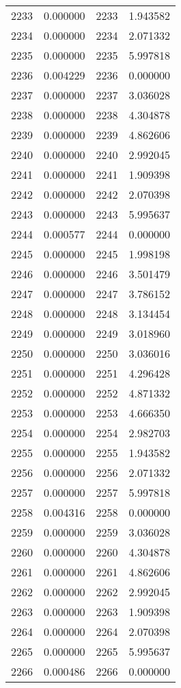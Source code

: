 \documentclass[12pt]{article}
\begin{document}
\begin{longtable}{@{}cccc@{}}
2233 & 0.000000 & 2233 & 1.943582 \\
2234 & 0.000000 & 2234 & 2.071332 \\
2235 & 0.000000 & 2235 & 5.997818 \\
2236 & 0.004229 & 2236 & 0.000000 \\
2237 & 0.000000 & 2237 & 3.036028 \\
2238 & 0.000000 & 2238 & 4.304878 \\
2239 & 0.000000 & 2239 & 4.862606 \\
2240 & 0.000000 & 2240 & 2.992045 \\
2241 & 0.000000 & 2241 & 1.909398 \\
2242 & 0.000000 & 2242 & 2.070398 \\
2243 & 0.000000 & 2243 & 5.995637 \\
2244 & 0.000577 & 2244 & 0.000000 \\
2245 & 0.000000 & 2245 & 1.998198 \\
2246 & 0.000000 & 2246 & 3.501479 \\
2247 & 0.000000 & 2247 & 3.786152 \\
2248 & 0.000000 & 2248 & 3.134454 \\
2249 & 0.000000 & 2249 & 3.018960 \\
2250 & 0.000000 & 2250 & 3.036016 \\
2251 & 0.000000 & 2251 & 4.296428 \\
2252 & 0.000000 & 2252 & 4.871332 \\
2253 & 0.000000 & 2253 & 4.666350 \\
2254 & 0.000000 & 2254 & 2.982703 \\
2255 & 0.000000 & 2255 & 1.943582 \\
2256 & 0.000000 & 2256 & 2.071332 \\
2257 & 0.000000 & 2257 & 5.997818 \\
2258 & 0.004316 & 2258 & 0.000000 \\
2259 & 0.000000 & 2259 & 3.036028 \\
2260 & 0.000000 & 2260 & 4.304878 \\
2261 & 0.000000 & 2261 & 4.862606 \\
2262 & 0.000000 & 2262 & 2.992045 \\
2263 & 0.000000 & 2263 & 1.909398 \\
2264 & 0.000000 & 2264 & 2.070398 \\
2265 & 0.000000 & 2265 & 5.995637 \\
2266 & 0.000486 & 2266 & 0.000000 \\

\end{longtable}
\end{document}
